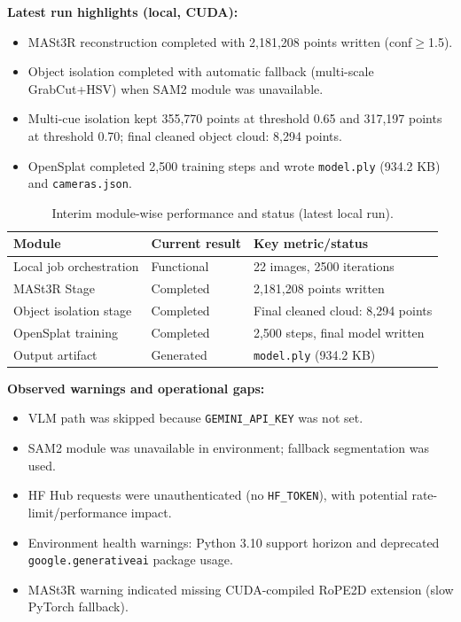 \documentclass[10pt,twocolumn,letterpaper]{article}
\begin{document}
\textbf{Latest run highlights (local, CUDA):}
\begin{itemize}[leftmargin=*]
    \item MASt3R reconstruction completed with 2,181,208 points written (conf\(\ge\)1.5).
    \item Object isolation completed with automatic fallback (multi-scale GrabCut+HSV) when SAM2 module was unavailable.
    \item Multi-cue isolation kept 355,770 points at threshold 0.65 and 317,197 points at threshold 0.70; final cleaned object cloud: 8,294 points.
    \item OpenSplat completed 2,500 training steps and wrote \texttt{model.ply} (934.2 KB) and \texttt{cameras.json}.
\end{itemize}

\begin{table}[t]
\centering
\caption{Interim module-wise performance and status (latest local run).}
\label{tab:interim}
\small
\begin{tabularx}{\columnwidth}{@{}l Y Y@{}}
\toprule
Module & Current result & Key metric/status \\
\midrule
Local job orchestration & Functional & 22 images, 2500 iterations \\
MASt3R Stage & Completed & 2,181,208 points written \\
Object isolation stage & Completed & Final cleaned cloud: 8,294 points \\
OpenSplat training & Completed & 2,500 steps, final model written \\
Output artifact & Generated & \texttt{model.ply} (934.2 KB) \\
\bottomrule
\end{tabularx}
\end{table}

\textbf{Observed warnings and operational gaps:}
\begin{itemize}[leftmargin=*]
    \item VLM path was skipped because \texttt{GEMINI\_API\_KEY} was not set.
    \item SAM2 module was unavailable in environment; fallback segmentation was used.
    \item HF Hub requests were unauthenticated (no \texttt{HF\_TOKEN}), with potential rate-limit/performance impact.
    \item Environment health warnings: Python 3.10 support horizon and deprecated \texttt{google.generativeai} package usage.
    \item MASt3R warning indicated missing CUDA-compiled RoPE2D extension (slow PyTorch fallback).
\end{itemize}
\end{document}

